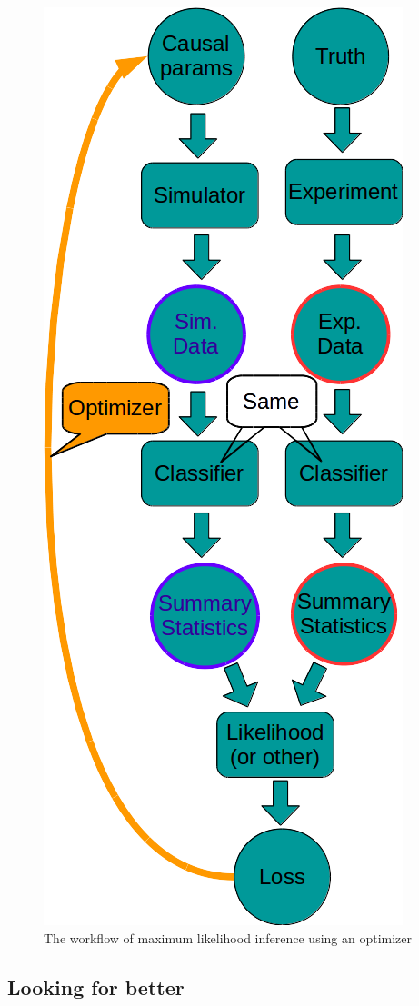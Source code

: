 \begin{figure}[htb]
    \centering
    \includegraphics[width=0.3\linewidth]{workflow}
    \caption{The workflow of maximum likelihood inference using an optimizer}
    \label{fig:workflow}
\end{figure}





\subsection{Looking for better} %
\label{sub:looking_for_better}





